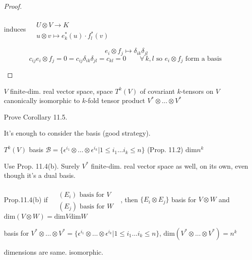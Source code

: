 \begin{proof}
\begin{enumerate}
induces $\begin{aligned} & \quad \\ 
  & U\otimes V \to K \\ 
   & u \otimes v \mapsto e^*_k(u) \cdot f_l^*(v) \end{aligned}$

\[
e_i \otimes f_j \mapsto \delta_{ik} \delta_{jl}
\]
\[
c_{ij} e_i \otimes f_j = 0 = c_{ij} \delta_{ik} \delta_{jl} = c_{kl} = 0 \quad \quad \forall \, k,l \text{ so } e_i\otimes f_j \text{ form a basis }
\]

\end{enumerate}
\end{proof}



\begin{corollary}[11.5] $V$ finite-dim. real vector space, space $T^k(V)$ of covariant $k$-tensors on $V$ canonically isomorphic to $k$-fold tensor product $V^* \otimes \dots \otimes V^*$
\end{corollary}

 Prove Corollary 11.5.  

It's enough to consider the basis (good strategy).  

$T^k(V)$ basis $\mathcal{B} = \lbrace \epsilon^{i_1} \otimes \dots \otimes \epsilon^{i_k} | 1 \leq i_1 \dots i_k \leq n \rbrace$ (Prop. 11.2) $\text{dim}{n^k}$

Use Prop. 11.4(b).  Surely $V^*$ finite-dim. real vector space as well, on its own, even though it's a dual basis. 

Prop.11.4(b) if $\begin{aligned} & \quad \\ 
& (E_i) \text{ basis for $V$ } \\ 
  & (E_j) \text{ basis for $W$ } \end{aligned}$, \quad then $\lbrace E_i \otimes E_j \rbrace$ basis for $V\otimes W$ and $\text{dim}{ (V\otimes W)} = \text{dim}{V} \text{dim}{W}$

basis for $V^* \otimes \dots \otimes V^* = \lbrace \epsilon^{i_1} \otimes \dots \otimes \epsilon^{i_k} | 1 \leq i_1 \dots i_k \leq n \rbrace$, \quad $\text{dim}{ (V^* \otimes \dots \otimes V^*) } = n^k$

dimensions are same.  isomorphic.  

\staveXXIX




